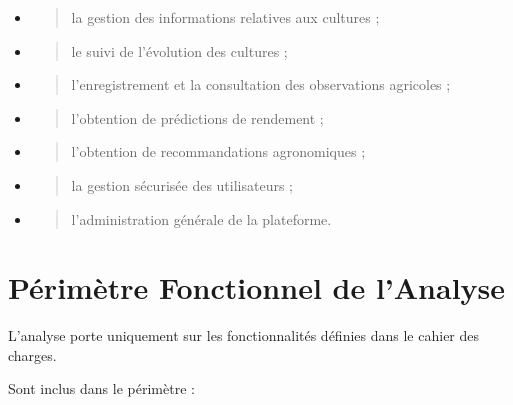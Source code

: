 \begin{itemize}
\item
  \begin{quote}
  la gestion des informations relatives aux cultures ;
  \end{quote}
\item
  \begin{quote}
  le suivi de l'évolution des cultures ;
  \end{quote}
\item
  \begin{quote}
  l'enregistrement et la consultation des observations agricoles ;
  \end{quote}
\item
  \begin{quote}
  l'obtention de prédictions de rendement ;
  \end{quote}
\item
  \begin{quote}
  l'obtention de recommandations agronomiques ;
  \end{quote}
\item
  \begin{quote}
  la gestion sécurisée des utilisateurs ;
  \end{quote}
\item
  \begin{quote}
  l'administration générale de la plateforme.
  \end{quote}
\end{itemize}

\hypertarget{puxe9rimuxe8tre-fonctionnel-de-lanalyse}{%
\section{Périmètre Fonctionnel de
l'Analyse}\label{puxe9rimuxe8tre-fonctionnel-de-lanalyse}}

L'analyse porte uniquement sur les fonctionnalités définies dans le
cahier des charges.

Sont inclus dans le périmètre :

